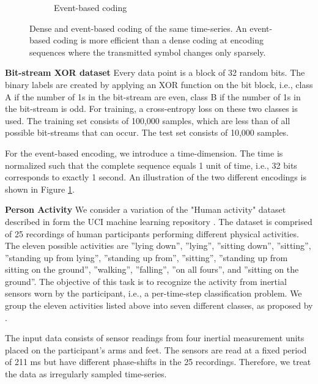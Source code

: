 \documentclass{article}
\begin{document}
\begin{figure}
\begin{subfigure}[t]{0.49\textwidth}
         \caption{Event-based coding}
     \end{subfigure}
     \caption{Dense and event-based coding of the same time-series. An event-based coding is more efficient than a dense coding at encoding sequences where the transmitted symbol changes only sparsely.}
     \label{fig:coding}
 \end{figure}


\textbf{Bit-stream XOR dataset}
Every data point is a block of 32 random bits. The binary labels are created by applying an XOR function on the bit block, i.e., class A if the number of 1s in the bit-stream are even, class B if the number of 1s in the bit-stream is odd. 
For training, a cross-entropy loss on these two classes is used. 
The training set consists of 100,000 samples, which are less than  of all possible bit-streams that can occur.
The test set consists of 10,000 samples. 

For the event-based encoding, we introduce a time-dimension.
The time is normalized such that the complete sequence equals 1 unit of time, i.e., 32 bits corresponds to exactly 1 second. 
An illustration of the two different encodings is shown in Figure \ref{fig:coding}.


\textbf{Person Activity} We consider a variation of the "Human activity" dataset described in \cite{rubanova2019latent} form the UCI machine learning repository \cite{dua2019}. 
The dataset is comprised of 25 recordings of human participants
performing different physical activities.
The eleven possible activities are ''lying down'', ''lying'', ''sitting down'', ''sitting'', ''standing up from lying'', ''standing up from'', ''sitting'', ''standing up from sitting on the ground'', ''walking'', ''falling'', ''on all fours'', and ''sitting on the ground''. 
The objective of this task is to recognize the activity from inertial sensors worn by the participant, i.e., a per-time-step classification problem.
We group the eleven activities listed above into seven different classes, as proposed by \cite{rubanova2019latent}. 

The input data consists of sensor readings from four inertial measurement units placed on the participant's arms and feet.
The sensors are read at a fixed period of 211 ms but have different phase-shifts in the 25 recordings. Therefore, we treat the data as irregularly sampled time-series.
\end{document}
